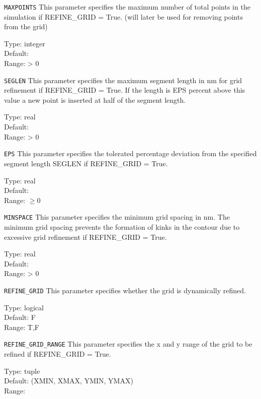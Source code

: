 \begin{keydescription}{\texttt{MAXPOINTS}}
This parameter specifies the maximum number of total points in the simulation if REFINE\_GRID = True. (will later be used for removing points from the grid) 
\begin{keytab}
   Type:    \> integer \\
   Default:  \\
   Range:   \> > 0
\end{keytab}
\end{keydescription}

\begin{keydescription}{\texttt{SEGLEN}}
This parameter specifies the maximum segment length in nm for grid refinement if REFINE\_GRID = True. If the length is EPS percent above this value a new point is inserted 
at half of the segment length.
\begin{keytab}
   Type:    \> real \\
   Default:  \\
   Range:   \> > 0
\end{keytab}
\end{keydescription}

\begin{keydescription}{\texttt{EPS}}
This parameter specifies the tolerated percentage deviation from the specified segment length SEGLEN if REFINE\_GRID = True. 
\begin{keytab}
   Type:    \> real \\
   Default:  \\
   Range:   \> $\ge 0$
\end{keytab}
\end{keydescription}

\begin{keydescription}{\texttt{MINSPACE}}
This parameter specifies the minimum grid spacing in nm. The minimum grid spacing prevents the formation of kinks in the contour due to excessive grid refinement if REFINE\_GRID = True.
\begin{keytab}
   Type:    \> real \\
   Default:  \\
   Range:   \> > 0
\end{keytab}
\end{keydescription}

\begin{keydescription}{\texttt{REFINE\_GRID}}
This parameter specifies whether the grid is dynamically refined. 
\begin{keytab}
   Type:    \> logical \\
   Default: \> F \\
   Range:   \> T,F
\end{keytab}
\end{keydescription}

\begin{keydescription}{\texttt{REFINE\_GRID\_RANGE}}
This parameter specifies the x and y range of the grid to be refined if REFINE\_GRID = True.
\begin{keytab}
   Type:    \> tuple \\
   Default: \> (XMIN, XMAX, YMIN, YMAX) \\
   Range:   \> \\
\end{keytab}
\end{keydescription}


